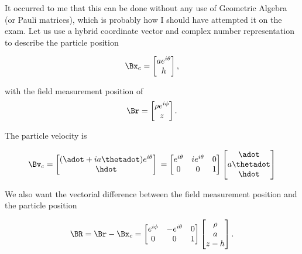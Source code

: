 {It occurred to me that this can be done without any use of Geometric Algebra (or Pauli matrices), which is probably how I should have attempted it on the exam.  Let us use a hybrid coordinate vector and complex number representation to describe the particle position

\begin{equation}\label{eqn:relativisticElectrodynamicsExamReflection:800}
\Bx_c = 
\begin{bmatrix}
a e^{i\theta} \\
h
\end{bmatrix},
\end{equation}

with the field measurement position of
\begin{equation}\label{eqn:relativisticElectrodynamicsExamReflection:820}
\Br = 
\begin{bmatrix}
\rho e^{i\phi} \\
z
\end{bmatrix}.
\end{equation}

The particle velocity is

\begin{equation}\label{eqn:relativisticElectrodynamicsExamReflection:840}
\Bv_c 
= 
\begin{bmatrix}
(\adot + i a \thetadot) e^{i\theta} \\
\hdot
\end{bmatrix} \\
=
\begin{bmatrix}
e^{i\theta} & i e^{i\theta} & 0 \\
0 & 0 & 1
\end{bmatrix} 
\begin{bmatrix}
\adot \\
a \thetadot \\
\hdot
\end{bmatrix}
\end{equation}

We also want the vectorial difference between the field measurement position and the particle position

\begin{equation}\label{eqn:relativisticElectrodynamicsExamReflection:860}
\BR = \Br - \Bx_c = 
\begin{bmatrix}
e^{i\phi} & -e^{i\theta} & 0 \\
0 & 0 & 1
\end{bmatrix}
\begin{bmatrix}
\rho \\
a \\
z - h
\end{bmatrix}.
\end{equation}

}
